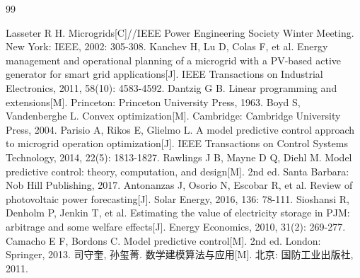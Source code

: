 
\newpage
\begin{thebibliography}{99}

 Lasseter R H. Microgrids[C]//IEEE Power Engineering Society Winter Meeting. New York: IEEE, 2002: 305-308.
 Kanchev H, Lu D, Colas F, et al. Energy management and operational planning of a microgrid with a PV-based active generator for smart grid applications[J]. IEEE Transactions on Industrial Electronics, 2011, 58(10): 4583-4592.
 Dantzig G B. Linear programming and extensions[M]. Princeton: Princeton University Press, 1963.
 Boyd S, Vandenberghe L. Convex optimization[M]. Cambridge: Cambridge University Press, 2004.
 Parisio A, Rikos E, Glielmo L. A model predictive control approach to microgrid operation optimization[J]. IEEE Transactions on Control Systems Technology, 2014, 22(5): 1813-1827.
 Rawlings J B, Mayne D Q, Diehl M. Model predictive control: theory, computation, and design[M]. 2nd ed. Santa Barbara: Nob Hill Publishing, 2017.
 Antonanzas J, Osorio N, Escobar R, et al. Review of photovoltaic power forecasting[J]. Solar Energy, 2016, 136: 78-111.
 Sioshansi R, Denholm P, Jenkin T, et al. Estimating the value of electricity storage in PJM: arbitrage and some welfare effects[J]. Energy Economics, 2010, 31(2): 269-277.
 Camacho E F, Bordons C. Model predictive control[M]. 2nd ed. London: Springer, 2013.
 司守奎, 孙玺菁. 数学建模算法与应用[M]. 北京: 国防工业出版社, 2011.

\end{thebibliography}

